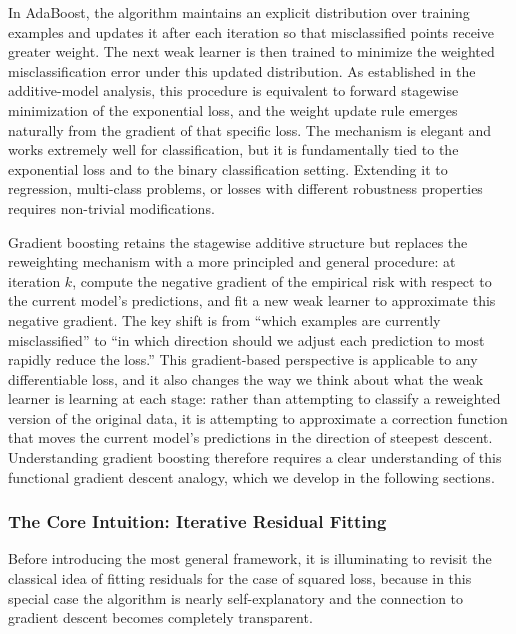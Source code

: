 In AdaBoost, the algorithm maintains an explicit distribution over training examples and updates it after each iteration so that misclassified points receive greater weight. The next weak learner is then trained to minimize the weighted misclassification error under this updated distribution. As established in the additive-model analysis, this procedure is equivalent to forward stagewise minimization of the exponential loss, and the weight update rule emerges naturally from the gradient of that specific loss. The mechanism is elegant and works extremely well for classification, but it is fundamentally tied to the exponential loss and to the binary classification setting. Extending it to regression, multi-class problems, or losses with different robustness properties requires non-trivial modifications.

Gradient boosting retains the stagewise additive structure but replaces the reweighting mechanism with a more principled and general procedure: at iteration $k$, compute the negative gradient of the empirical risk with respect to the current model's predictions, and fit a new weak learner to approximate this negative gradient. The key shift is from ``which examples are currently misclassified'' to ``in which direction should we adjust each prediction to most rapidly reduce the loss.'' This gradient-based perspective is applicable to any differentiable loss, and it also changes the way we think about what the weak learner is learning at each stage: rather than attempting to classify a reweighted version of the original data, it is attempting to approximate a correction function that moves the current model's predictions in the direction of steepest descent. Understanding gradient boosting therefore requires a clear understanding of this functional gradient descent analogy, which we develop in the following sections.

\subsubsection*{The Core Intuition: Iterative Residual Fitting}

Before introducing the most general framework, it is illuminating to revisit the classical idea of fitting residuals for the case of squared loss, because in this special case the algorithm is nearly self-explanatory and the connection to gradient descent becomes completely transparent.

